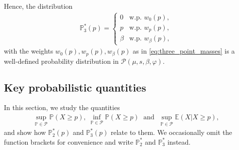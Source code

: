 \documentclass[11pt]{article}
\newcommand{\bP}{\mathbb{P}}
\newcommand{\cP}{\mathcal{P}}
\newcommand{\cPpar}{\mathcal{P}(\mu,s,\beta,\varphi)}
\newcommand{\bE}{\mathbb{E}}
\newcommand{\1}{\mathds{1}}
\begin{document}
\noindent Hence, the distribution
\begin{align}\label{P^*_3}
    \bP^*_3(p) = \left\{ \begin{array}{ll}
        0 & \text{w.p. } w_0(p), \\
        p & \text{w.p. } w_p(p), \\
        \beta & \text{w.p. } w_\beta(p),
    \end{array}\right.
\end{align}
with the weights $w_0(p),w_p(p),w_\beta(p)$ as in \eqref{eq:three_point_masses} is a well-defined probability distribution in $\cPpar$.

\color{black}
\subsection{Key probabilistic quantities}\label{sec23pointsfund}
In this section, we study the quantities
\begin{align}\label{eq:fundq} 
    \sup_{\bP\in\cP}\bP(X\geq p),\; \inf_{\bP\in\cP}\bP(X\geq p) \; \text{ and } \; \sup_{\bP\in \cP}\bE(X|X \geq p),
\end{align}
and show how $\bP^*_2(p)$ and $\bP^*_3(p)$ relate to them. We occasionally omit the function brackets for convenience and write $\bP^*_2$ and $\bP^*_3$ instead.
\end{document}
